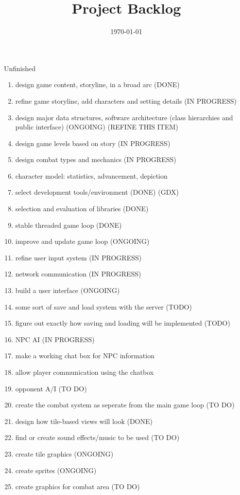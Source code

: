 \documentclass[12pt]{article}
\title{Project Backlog}
\date{\today}
\begin{document}
\maketitle

\begin{section}{Unfinished}
\begin{enumerate}

\item design game content, storyline, in a broad arc (DONE)
\item refine game storyline, add characters and setting details (IN PROGRESS)

\item design major data structures, software architecture (class
	hierarchies and public interface) (ONGOING) (REFINE THIS ITEM)
	
\item design game levels based on story (IN PROGRESS)
\item design combat types and mechanics (IN PROGRESS)

\item character model: statistics, advancement, depiction

\item select development tools/environment (DONE) (GDX)
\item selection and evaluation of libraries (DONE)

\item stable threaded game loop (DONE)
\item improve and update game loop (ONGOING)
\item refine user input system (IN PROGRESS)
\item network communication (IN PROGRESS)
\item build a user interface (ONGOING)
\item some sort of save and load system with the server (TODO)
\item figure out exactly how saving and loading will be implemented (TODO)


\item NPC AI (IN PROGRESS)
\item make a working chat box for NPC information
\item allow player communication using the chatbox
\item opponent A/I (TO DO)
\item create the combat system as seperate from the main game loop (TO DO)


\item design how tile-based views will look (DONE)
\item find or create sound effects/music to be used (TO DO)
\item create tile graphics (ONGOING)
\item create sprites (ONGOING)
\item create graphics for combat area (TO DO)


\end{enumerate}
\end{section}
\end{document}
